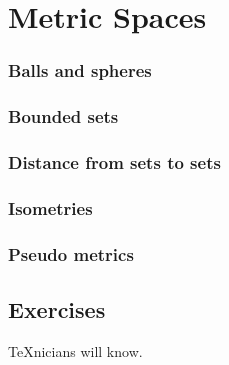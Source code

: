 \chapter{Metric Spaces}\label{chp:metric-spaces}




\subsection{Balls and spheres}

\subsection{Bounded sets}

\subsection{Distance from sets to sets}

\subsection{Isometries}

\subsection{Pseudo metrics}

\section{Exercises}

\begin{exercise}
  \TeX{}nicians will know.
\end{exercise}
